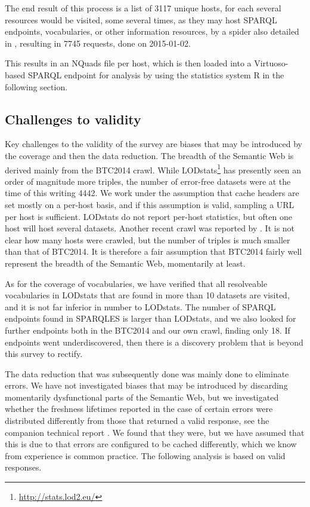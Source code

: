 \documentclass{llncs}
\begin{document}
The end result of this process is a list of 3117 unique hosts, for
each several resources would be visited, some several times, as they
may host SPARQL endpoints, vocabularies, or other information
resources, by a spider also detailed in
\cite{kjernsmo_add_survey_2015}, resulting in 7745 requests, done on
2015-01-02.

This results in an NQuads file per host, which is then loaded into a
Virtuoso-based SPARQL endpoint for analysis by using the statistics
system R\cite{kn:r} in the following section.

\subsection{Challenges to validity}

Key challenges to the validity of the survey are biases that may be
introduced by the coverage and then the data reduction. The breadth of
the Semantic Web is derived mainly from the BTC2014 crawl. While
LODstats\footnote{\url{http://stats.lod2.eu/}} has presently seen an
order of magnitude more triples, the number of error-free datasets
were at the time of this writing 4442. We work under the assumption
that cache headers are set mostly on a per-host basis, and if this
assumption is valid, sampling a URL per host is sufficient. LODstats
do not report per-host statistics, but often one host will host
several datasets. Another recent crawl was reported by
\cite{stateoflod2014}. It is not clear how many hosts were crawled, but the
number of triples is much smaller than that of
BTC2014. It is therefore a fair assumption that BTC2014 fairly well
represent the breadth of the Semantic Web, momentarily at least. 

As for the coverage of vocabularies, we have verified that all
resolveable vocabularies in LODstats that are found in more than 10
datasets are visited, and it is not far inferior in number to
LODstats. The number of SPARQL endpoints found in SPARQLES is larger
than LODstats, and we also looked for further endpoints both in the
BTC2014 and our own crawl, finding only 18. If endpoints went
underdiscovered, then there is a discovery problem that is beyond this
survey to rectify.

The data reduction that was subsequently done was mainly done to
eliminate errors. We have not investigated biases that may be
introduced by discarding momentarily dysfunctional parts of the
Semantic Web, but we investigated whether the freshness lifetimes
reported in the case of certain errors were distributed differently
from those that returned a valid response, see the companion technical
report \cite{kjernsmo_add_survey_2015}. We found that they were, but
we have assumed that this is due to that errors are configured to be
cached differently, which we know from experience is common
practice. The following analysis is based on valid responses.
\end{document}
